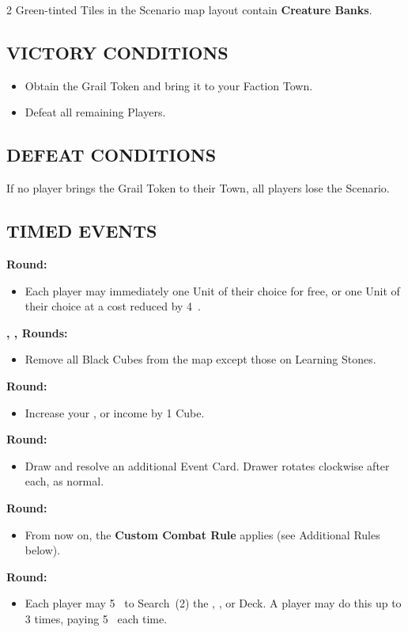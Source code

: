 \begin{multicols}{2}
Green-tinted Tiles in the Scenario map layout contain \textbf{Creature Banks}.

\subsection*{\MakeUppercase{Victory Conditions}}
\begin{itemize}
  \item Obtain the Grail Token and bring it to your Faction Town.
  \item Defeat all remaining Players.
\end{itemize}

\subsection*{\MakeUppercase{Defeat Conditions}}
If no player brings the Grail Token to their Town, all players lose the Scenario.

\subsection*{\MakeUppercase{Timed Events}}
\textbf{ Round:}
\begin{itemize}
  \item Each player may immediately  one  Unit of their choice for free, or one  Unit of their choice at a cost reduced by 4~.
\end{itemize}
\textbf{, ,  Rounds:}
\begin{itemize}
  \item Remove all Black Cubes from the map except those on Learning Stones.
\end{itemize}
\textbf{ Round:}
\begin{itemize}
  \item Increase your ,  or  income by 1 Cube.
\end{itemize}
\textbf{ Round:}
\begin{itemize}
  \item Draw and resolve an additional Event Card. Drawer rotates clockwise after each, as normal.
\end{itemize}
\textbf{ Round:}
\begin{itemize}
  \item From now on, the \textbf{Custom Combat Rule} applies (see Additional Rules below).
\end{itemize}
\textbf{ Round:}
\begin{itemize}
  \item Each player may  5~ to Search~(2) the , , or  Deck.
    A player may do this up to 3 times, paying 5~ each time.
\end{itemize}


\end{multicols}
